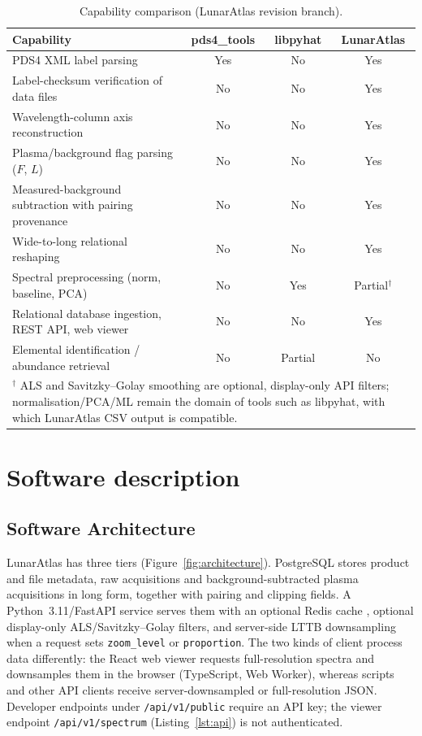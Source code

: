 \documentclass[final,5p,twocolumn,a4paper]{elsarticle}
\begin{document}
\begin{table}[!htbp]
\centering
\small
\begin{tabular}{lccc}
\toprule
\textbf{Capability} & \textbf{pds4\_tools} \cite{pds4_tools_ref} & \textbf{libpyhat} \cite{anderson2019libpyhat} & \textbf{LunarAtlas} \\
\midrule
PDS4 XML label parsing & Yes & No & Yes \\
Label-checksum verification of data files & No & No & Yes \\
Wavelength-column axis reconstruction & No & No & Yes \\
Plasma/background flag parsing ($F$, $L$) & No & No & Yes \\
Measured-background subtraction with pairing provenance & No & No & Yes \\
Wide-to-long relational reshaping & No & No & Yes \\
Spectral preprocessing (norm, baseline, PCA) & No & Yes & Partial$^\dagger$ \\
Relational database ingestion, REST API, web viewer & No & No & Yes \\
Elemental identification / abundance retrieval & No & Partial & No \\
\bottomrule
\multicolumn{4}{p{0.95\textwidth}}{\footnotesize $^\dagger$ ALS and Savitzky--Golay smoothing are optional, display-only API filters; normalisation/PCA/ML remain the domain of tools such as libpyhat, with which LunarAtlas CSV output is compatible.}
\end{tabular}
\caption{Capability comparison (LunarAtlas revision branch).}
\label{table:capability_comparison}
\end{table}

\section{Software description}

\subsection{Software Architecture}

LunarAtlas has three tiers (Figure~\ref{fig:architecture}). PostgreSQL \cite{postgresql} stores product and file metadata, raw acquisitions and background-subtracted plasma acquisitions in long form, together with pairing and clipping fields. A Python~3.11/FastAPI service \cite{fastapi} serves them with an optional Redis cache \cite{redis}, optional display-only ALS/Savitzky--Golay filters, and server-side LTTB downsampling when a request sets \texttt{zoom\_level} or \texttt{proportion}. The two kinds of client process data differently: the React \cite{react} web viewer requests full-resolution spectra and downsamples them in the browser (TypeScript, Web Worker), whereas scripts and other API clients receive server-downsampled or full-resolution JSON. Developer endpoints under \texttt{/api/v1/public} require an API key; the viewer endpoint \texttt{/api/v1/spectrum} (Listing~\ref{lst:api}) is not authenticated.
\end{document}
